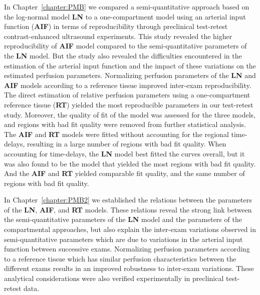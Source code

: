 In Chapter~\ref{chapter:PMB} we compared a semi-quantitative approach based on the log-normal model \textbf{LN} to a one-compartment model using an arterial input function (\textbf{AIF}) in terms of reproducibility through preclinical test-retest contrast-enhanced ultrasound experiments.
This study revealed the higher reproducibility of \textbf{AIF} model compared to the semi-quantitative parameters of the \textbf{LN} model.
But the study also revealed the difficulties encountered in the estimation of the arterial input function and the impact of these variations on the estimated perfusion parameters.
Normalizing perfusion parameters of the \textbf{LN} and \textbf{AIF} models according to a reference tissue improved inter-exam reproducibility.
The direct estimation of relative perfusion parameters using a one-compartment reference tissue (\textbf{RT}) yielded the most reproducible parameters in our test-retest study.
Moreover, the quality of fit of the model was assessed for the three models, and regions with bad fit quality were removed from further statistical analysis.
The \textbf{AIF} and \textbf{RT} models were fitted without accounting for the regional time-delays, resulting in a large number of regions with bad fit quality.
When accounting for time-delays, the \textbf{LN} model best fitted the curves overall, but it was also found to be the model that yielded the most regions with bad fit quality.
And the \textbf{AIF} and \textbf{RT} yielded comparable fit quality, and the same number of regions with bad fit quality.

In Chapter~\ref{chapter:PMB2} we established the relations between the parameters of the \textbf{LN}, \textbf{AIF}, and \textbf{RT} models.
These relations reveal the strong link between the semi-quantitative parameters of the \textbf{LN} model and the parameters of the compartmental approaches, but also explain the inter-exam variations observed in semi-quantitative parameters which are due to variations in the arterial input function between successive exams.
Normalizing perfusion parameters according to a reference tissue which has similar perfusion characteristics between the different exams results in an improved robustness to inter-exam variations.
These analytical considerations were also verified experimentally in preclinical test-retest data.

